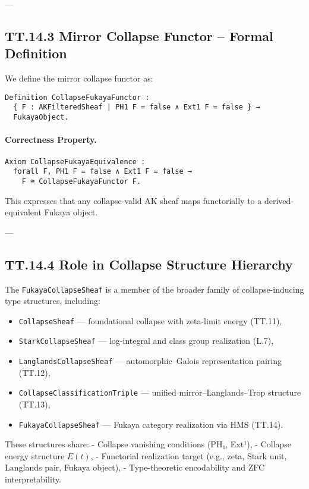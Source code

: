 \documentclass[11pt]{article}
\begin{document}
{---

\subsection*{TT.14.3 Mirror Collapse Functor – Formal Definition}

We define the mirror collapse functor as:

\begin{verbatim}
Definition CollapseFukayaFunctor :
  { F : AKFilteredSheaf | PH1 F = false ∧ Ext1 F = false } →
  FukayaObject.
\end{verbatim}

\paragraph{Correctness Property.}
\begin{verbatim}
Axiom CollapseFukayaEquivalence :
  forall F, PH1 F = false ∧ Ext1 F = false →
    F ≅ CollapseFukayaFunctor F.
\end{verbatim}

This expresses that any collapse-valid AK sheaf maps functorially to a derived-equivalent Fukaya object.

---

\subsection*{TT.14.4 Role in Collapse Structure Hierarchy}

The \texttt{FukayaCollapseSheaf} is a member of the broader family of collapse-inducing type structures, including:

\begin{itemize}
  \item \texttt{CollapseSheaf} — foundational collapse with zeta-limit energy (TT.11),
  \item \texttt{StarkCollapseSheaf} — log-integral and class group realization (L.7),
  \item \texttt{LanglandsCollapseSheaf} — automorphic–Galois representation pairing (TT.12),
  \item \texttt{CollapseClassificationTriple} — unified mirror–Langlands–Trop structure (TT.13),
  \item \texttt{FukayaCollapseSheaf} — Fukaya category realization via HMS (TT.14).
\end{itemize}

These structures share:
- Collapse vanishing conditions (PH₁, Ext¹),
- Collapse energy structure \( E(t) \),
- Functorial realization target (e.g., zeta, Stark unit, Langlands pair, Fukaya object),
- Type-theoretic encodability and ZFC interpretability.

}
\end{document}
